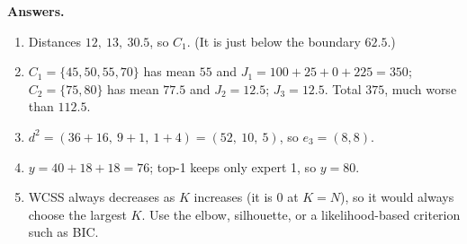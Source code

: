 \documentclass[11pt,a4paper]{article}
\begin{document}
\textbf{Answers.}
\begin{enumerate}
\item Distances $12,\ 13,\ 30.5$, so $C_1$. (It is just below the boundary $62.5$.)
\item $C_1=\{45,50,55,70\}$ has mean $55$ and $J_1=100+25+0+225=350$; $C_2=\{75,80\}$ has mean $77.5$ and $J_2=12.5$; $J_3=12.5$. Total $375$, much worse than $112.5$.
\item $d^2=(36+16,\ 9+1,\ 1+4)=(52,\ 10,\ 5)$, so $e_3=(8,8)$.
\item $y=40+18+18=76$; top-1 keeps only expert 1, so $y=80$.
\item WCSS always decreases as $K$ increases (it is $0$ at $K=N$), so it would always choose the largest $K$. Use the elbow, silhouette, or a likelihood-based criterion such as BIC.
\end{enumerate}
\end{document}
